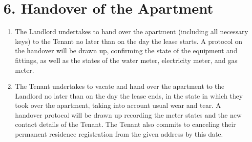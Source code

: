 \section*{6. Handover of the Apartment}

\begin{enumerate}[label=\arabic*.]
    \item The Landlord undertakes to hand over the apartment (including all necessary keys) to the Tenant no later than on the day the lease starts. A protocol on the handover will be drawn up, confirming the state of the equipment and fittings, as well as the states of the water meter, electricity meter, and gas meter.
    \item The Tenant undertakes to vacate and hand over the apartment to the Landlord no later than on the day the lease ends, in the state in which they took over the apartment, taking into account usual wear and tear. A handover protocol will be drawn up recording the meter states and the new contact details of the Tenant. The Tenant also commits to canceling their permanent residence registration from the given address by this date.
\end{enumerate}

